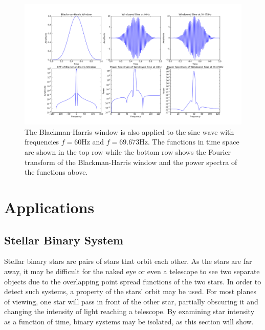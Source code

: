 \documentclass[twocolumn]{article}
\begin{document}
\begin{figure}
  \includegraphics[width=\linewidth]{blackman_harris.png}
  \caption{
    The Blackman-Harris window is also applied to the sine wave with
    frequencies $f = 60$Hz and $f = 69.673$Hz. The functions in time space are
    shown in the top row while the bottom row shows the Fourier transform of the
    Blackman-Harris window and the power spectra of the functions above.
  }
  \label{fig:blackman_harris}
\end{figure}


\section{Applications}
\subsection{Stellar Binary System}

Stellar binary stars are pairs of stars that orbit each other. As the stars are far away, it may be difficult for the naked eye or even a telescope to see two separate objects due to the overlapping point spread functions of the two stars. In order to detect such systems, a property of the stars' orbit may be used. For most planes of viewing, one star will pass in front of the other star, partially obscuring it and changing the intensity of light reaching a telescope. By examining star intensity as a function of time, binary systems may be isolated, as this section will show.
\end{document}
